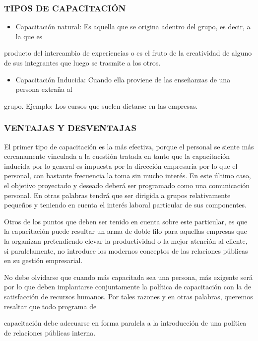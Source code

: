 \subsubsection*{TIPOS DE CAPACITACIÓN}
\begin{itemize}
  \item Capacitación natural: Es aquella que se origina adentro del grupo, es decir, a la que es
\end{itemize}
producto del intercambio de experiencias o es el fruto de la creatividad de alguno de sus integrantes que luego se trasmite a los otros.

\begin{itemize}
  \item Capacitación Inducida: Cuando ella proviene de las enseñanzas de una persona extraña al
\end{itemize}
grupo. Ejemplo: Los cursos que suelen dictarse en las empresas.

\subsubsection*{VENTAJAS Y DESVENTAJAS}
El primer tipo de capacitación es la más efectiva, porque el personal se siente más cercanamente vinculada a la cuestión tratada en tanto que la capacitación inducida por lo general es impuesta por la dirección empresaria por lo que el personal, con bastante frecuencia la toma sin mucho interés. En este último caso, el objetivo proyectado y deseado deberá ser programado como una comunicación personal. En otras palabras tendrá que ser dirigida a grupos relativamente pequeños y teniendo en cuenta el interés laboral particular de sus componentes.

Otros de los puntos que deben ser tenido en cuenta sobre este particular, es que la capacitación puede resultar un arma de doble filo para aquellas empresas que la organizan pretendiendo elevar la productividad o la mejor atención al cliente, si paralelamente, no introduce los modernos conceptos de las relaciones públicas en su gestión empresarial.

No debe olvidarse que cuando más capacitada sea una persona, más exigente será por lo que deben implantarse conjuntamente la política de capacitación con la de satisfacción de recursos humanos. Por tales razones y en otras palabras, queremos resaltar que todo programa de



capacitación debe adecuarse en forma paralela a la introducción de una política de relaciones públicas interna.

